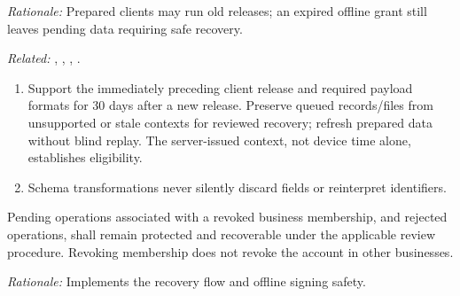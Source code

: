 \textit{Rationale:} Prepared clients may run old releases; an expired offline grant still leaves pending data requiring safe recovery.

\textit{Related:} \hyperref[fr:003]{}, \hyperref[fr:004]{}, \hyperref[fr:037]{}, \hyperref[fr:043]{}.
\begin{enumerate}[label=(\alph*),leftmargin=*,itemsep=1pt,topsep=3pt]
\item Support the immediately preceding client release and required payload formats for 30 days after a new release. Preserve queued records/files from unsupported or stale contexts for reviewed recovery; refresh prepared data without blind replay. The server-issued context, not device time alone, establishes eligibility.
\item Schema transformations never silently discard fields or reinterpret identifiers.
\end{enumerate}

\label{nfr:REL-08}
Pending operations associated with a revoked business membership, and rejected
operations, shall remain protected and recoverable under the applicable review
procedure. Revoking membership does not revoke the account in other businesses.

\textit{Rationale:} Implements the \hyperref[fr:008]{} recovery flow and offline signing safety.

